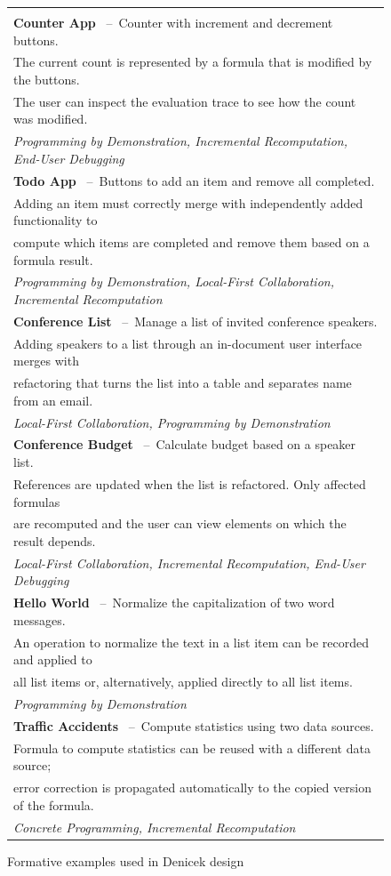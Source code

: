 \documentclass[sigconf,anonymous,screen]{acmart}
\begin{document}
\begin{figure}
\newcommand{\extablecol}[5]{
\small{\bfseries #1} #2\,\; --\,\; #3\\[-0.1em]
\quad \footnotesize #4 \\[-0.2em]
\quad \footnotesize \emph{#5} \\[0.4em]
}

\begin{tabular}{|l|}
\hline
\\[-1em]
\extablecol{Counter App}{\cite{kiss-2014-7guis}}
  {Counter with increment and decrement buttons.}
  {The current count is represented by a formula that is modified by the buttons.\\[-0.2em]\quad\footnotesize
  The user can inspect the evaluation trace to see how the count was modified.}
  {Programming by Demonstration, Incremental Recomputation, End-User Debugging}
\extablecol{Todo App}{\cite{osmani-2024-todomvc}}
  {Buttons to add an item and remove all completed.}
  {Adding an item must correctly merge with independently added functionality to \\[-0.2em]\quad\footnotesize
   compute which items are completed and remove them based on a formula result.}
  {Programming by Demonstration, Local-First Collaboration, Incremental Recomputation}
\extablecol{Conference List}{\cite{edwards-2025-schema}}
  {Manage a list of invited conference speakers.}
  {Adding speakers to a list through an in-document user interface merges with \\[-0.2em]\quad\footnotesize
   refactoring that turns the list into a table and separates name from an email.}
  {Local-First Collaboration, Programming by Demonstration}
\extablecol{Conference Budget}{\cite{edwards-2025-schema}}
  {Calculate budget based on a speaker list.}
  {References are updated  when the list is refactored. Only affected formulas\\[-0.2em]\quad\footnotesize
   are recomputed and the user can view elements on which the result depends.}
  {Local-First Collaboration, Incremental Recomputation, End-User Debugging}
\extablecol{Hello World}{\cite{miller-2001-simult}}
  {Normalize the capitalization of two word messages.}
  {An operation to normalize the text in a list item can be recorded and applied to\\[-0.2em]\quad\footnotesize
   all list items or, alternatively, applied directly to all list items.}
  {Programming by Demonstration}
\extablecol{Traffic Accidents}{\cite{edwards-2022-copypaste}}
  {Compute statistics using two data sources.}
  {Formula to compute statistics can be reused with a different data source;\\[-0.2em]\quad\footnotesize
   error correction is propagated automatically to the copied version of the formula.}
  {Concrete Programming, Incremental Recomputation}
\hline
\end{tabular}

\caption{Formative examples used in Denicek design}
\label{fig:examples}
\vspace{-1em}
\end{figure}
\end{document}
